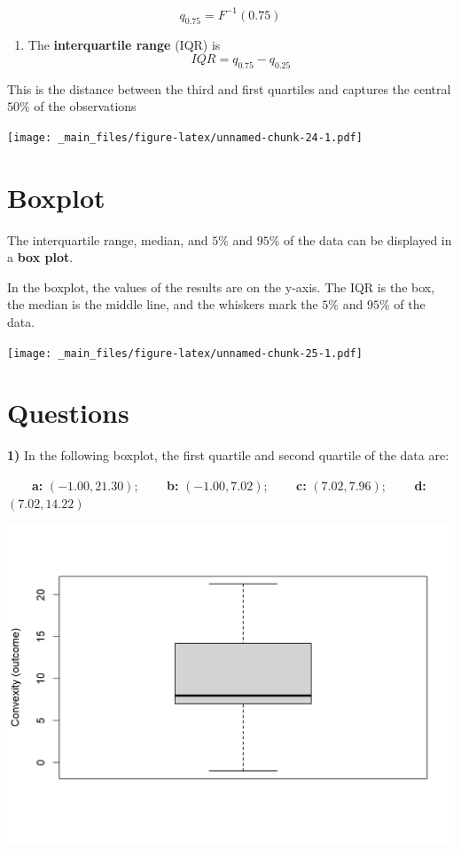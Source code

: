 \documentclass[
]{book}
\providecommand{\tightlist}{%
  \setlength{\itemsep}{0pt}\setlength{\parskip}{0pt}}
\begin{document}
\[q_{0.75}=F^{-1}(0.75)\]

\begin{enumerate}
\def\labelenumi{\arabic{enumi})}
\setcounter{enumi}{2}
\tightlist
\item
  The \textbf{interquartile range} (IQR) is \[IQR=q_{0.75} - q_{0.25}\]
\end{enumerate}

This is the distance between the third and first quartiles and captures the central \(50\%\) of the observations

\texttt{[image: \_main\_files/figure-latex/unnamed-chunk-24-1.pdf]}

\hypertarget{boxplot}{%
\section{Boxplot}\label{boxplot}}

The interquartile range, median, and \(5\%\) and \(95\%\) of the data can be displayed in a \textbf{box plot}.

In the boxplot, the values of the results are on the y-axis. The IQR is the box, the median is the middle line, and the whiskers mark the \(5\%\) and \(95\%\) of the data.

\texttt{[image: \_main\_files/figure-latex/unnamed-chunk-25-1.pdf]}

\hypertarget{questions}{%
\section{Questions}\label{questions}}

\textbf{1)} In the following boxplot, the first quartile and second quartile of the data are:

\textbf{\(\qquad\)a:} \((-1.00, 21.30)\); \textbf{\(\qquad\)b:} \((-1.00, 7.02)\); \textbf{\(\qquad\)c:} \((7.02, 7.96)\); \textbf{\(\qquad\)d:} \((7.02, 14.22)\)

\includegraphics{./figures/box.png}
\end{document}
